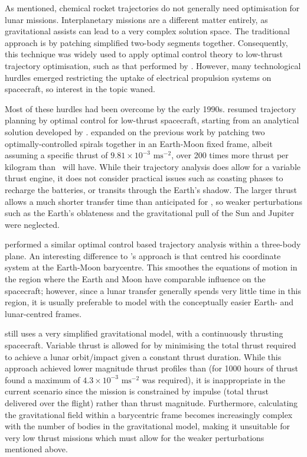 As mentioned, chemical rocket trajectories do not generally need optimisation for lunar missions. Interplanetary missions are a different matter entirely, as gravitational assists can lead to a very complex solution space. The traditional approach is by patching simplified two-body segments together. Consequently, this technique was widely used to apply optimal control theory to low-thrust trajectory optimisation, such as that performed by \textcite{Stuhlinger1964}. However, many technological hurdles emerged restricting the uptake of electrical propulsion systems on spacecraft, so interest in the topic waned.

Most of these hurdles had been overcome by the early 1990s. \textcite{Golan1994} resumed trajectory planning by optimal control for low-thrust spacecraft, starting from an analytical solution developed by \textcite{Breakwell1966}. \citeauthor{Golan1994} expanded on the previous work by patching two optimally-controlled spirals together in an Earth-Moon fixed frame, albeit assuming a specific thrust of $9.81\times10^{-3}\text{ ms}^{-2}$, over 200 times more thrust per kilogram than \BW\ will have. While their trajectory analysis does allow for a variable thrust engine, it does not consider practical issues such as coasting phases to recharge the batteries, or transits through the Earth's shadow. The larger thrust allows a much shorter transfer time than anticipated for \BW, so weaker perturbations such as the Earth's oblateness and the gravitational pull of the Sun and Jupiter were neglected.

\textcite{Guelman1995} performed a similar optimal control based trajectory analysis within a three-body plane. An interesting difference to \citeauthor{Golan1994}'s approach is that \citeauthor{Guelman1995} centred his coordinate system at the Earth-Moon barycentre. This smoothes the equations of motion in the region where the Earth and Moon have comparable influence on the spacecraft; however, since a lunar transfer generally spends very little time in this region, it is usually preferable to model with the conceptually easier Earth- and lunar-centred frames.
 
\citeauthor{Guelman1995} still uses a very simplified gravitational model, with a continuously thrusting spacecraft. Variable thrust is allowed for by minimising the total thrust required to achieve a lunar orbit/impact given a constant thrust duration. While this approach achieved lower magnitude thrust profiles than \citeauthor{Golan1994} (for 1000 hours of thrust \citeauthor{Guelman1995} found a maximum of $4.3\times10^{-3}\text{ ms}^{-2}$ was required), it is inappropriate in the current scenario since the mission is constrained by impulse (total thrust delivered over the flight) rather than thrust magnitude. Furthermore, calculating the gravitational field within a barycentric frame becomes increasingly complex with the number of bodies in the gravitational model, making it unsuitable for very low thrust missions which must allow for the weaker perturbations mentioned above.

